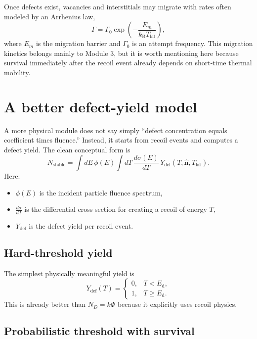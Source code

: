 \documentclass[11pt]{article}
\newcommand{\kb}{k_{\mathrm B}}
\newcommand{\Ed}{E_{\mathrm d}}
\newcommand{\Tlat}{T_{\mathrm{lat}}}
\newcommand{\Ydef}{Y_{\mathrm{def}}}
\begin{document}
Once defects exist, vacancies and interstitials may migrate with rates often modeled by an Arrhenius law,
\begin{equation}
\Gamma = \Gamma_0 \exp\!\left(-\frac{E_m}{\kb \Tlat}\right),
\end{equation}
where $E_m$ is the migration barrier and $\Gamma_0$ is an attempt frequency. This migration kinetics belongs mainly to Module 3, but it is worth mentioning here because survival immediately after the recoil event already depends on short-time thermal mobility.

\section{A better defect-yield model}

A more physical module does not say simply ``defect concentration equals coefficient times fluence.'' Instead, it starts from recoil events and computes a defect yield. The clean conceptual form is
\begin{equation}
N_{\mathrm{stable}} = \int dE\, \phi(E) \int dT\, \frac{d\sigma(E)}{dT} \, \Ydef(T, \hat{\mathbf n}, \Tlat).
\end{equation}
Here:
\begin{itemize}
    \item $\phi(E)$ is the incident particle fluence spectrum,
    \item $\frac{d\sigma}{dT}$ is the differential cross section for creating a recoil of energy $T$,
    \item $\Ydef$ is the defect yield per recoil event.
\end{itemize}

\subsection{Hard-threshold yield}

The simplest physically meaningful yield is
\begin{equation}
\Ydef(T)=
\begin{cases}
0, & T < \Ed,\\
1, & T \ge \Ed.
\end{cases}
\end{equation}
This is already better than $N_D = k\Phi$ because it explicitly uses recoil physics.

\subsection{Probabilistic threshold with survival}
\end{document}
